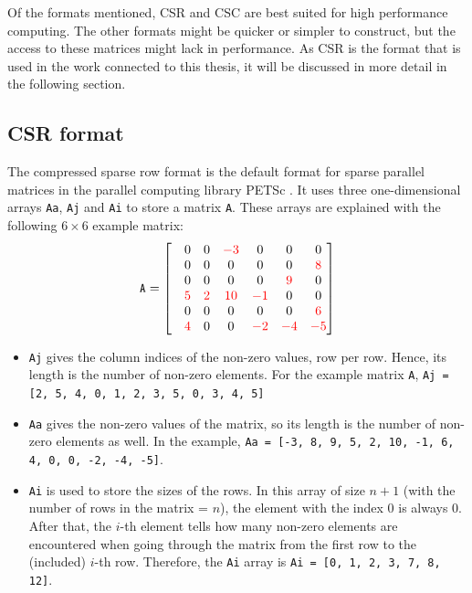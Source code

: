 Of the formats mentioned, CSR and CSC are best suited for high performance computing. The other formats might be quicker or simpler to construct, but the access to these matrices might lack in performance. As CSR is the format that is used in the work connected to this thesis, it will be discussed in more detail in the following section.

\subsection{CSR format}
\label{sec:csr_format}
The compressed sparse row format is the default format for sparse parallel matrices in the parallel computing library PETSc \cite{petsc-web-page}. It uses three one-dimensional arrays \texttt{Aa}, \texttt{Aj} and \texttt{Ai} to store a matrix \texttt{A}. These arrays are explained with the following $6 \times 6$ example matrix:
\begin{align}
\texttt{A} = 
\begin{bmatrix}
& 0 & 0 & \color{red}{-3} & 0  & 0  & 0  \\
                           & 0 & 0 & 0  & 0  & 0  & \color{red}{8}  \\
 & 0 & 0 & 0  & 0  & \color{red}{9}  & 0  \\
                           & \color{red}{5} & \color{red}{2} & \color{red}{10} & \color{red}{-1} & 0  & 0  \\
 & 0 & 0 & 0  & 0  & 0  & \color{red}{6}  \\
                           & \color{red}{4} & 0 & 0  & \color{red}{-2} & \color{red}{-4} & \color{red}{-5}
\end{bmatrix}
\label{equ:csr_example}
\end{align}

\begin{itemize}
\item \texttt{Aj} gives the column indices of the non-zero values, row per row. Hence, its length is the number of non-zero elements. For the example matrix \texttt{A}, \texttt{Aj = [2, 5, 4, 0, 1, 2, 3, 5, 0, 3, 4, 5]}
\item \texttt{Aa} gives the non-zero values of the matrix, so its length is the number of non-zero elements as well. In the example, \texttt{Aa = [-3, 8, 9, 5, 2, 10, -1, 6, 4, 0, 0, -2, -4, -5]}.
\item \texttt{Ai} is used to store the sizes of the rows. In this array of size $n+1$ (with the number of rows in the matrix = $n$), the element with the index 0 is  always 0. After that, the $i$-th element tells how many non-zero elements are encountered when going through the matrix from the first row to the (included) $i$-th row. Therefore, the  \texttt{Ai} array is \texttt{Ai = [0, 1, 2, 3, 7, 8, 12]}.
\end{itemize}

